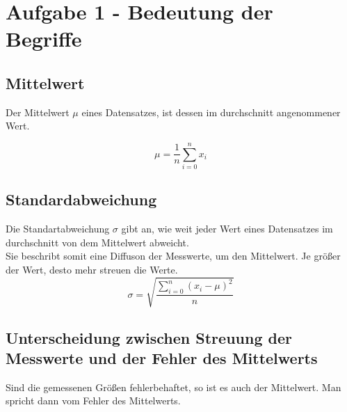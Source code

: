 \section{Aufgabe 1 - Bedeutung der Begriffe}
\subsection{Mittelwert}
    Der Mittelwert $\mu$ eines Datensatzes, ist dessen im durchschnitt angenommener Wert.

    \begin{equation*}
        \mu=\frac{1}{n}\sum_{i=0}^n x_i
    \end{equation*}
\subsection{Standardabweichung}
    Die Standartabweichung $\sigma$ gibt an, wie weit jeder Wert eines Datensatzes im durchschnitt von 
    dem Mittelwert abweicht.\\
    Sie beschribt somit eine Diffuson der Messwerte, um den Mittelwert. Je größer der Wert, desto
    mehr streuen die Werte.
    \begin{equation*}
        \sigma = \sqrt{\frac{\sum_{i=0}^n(x_i-\mu)^2}{n}}
    \end{equation*}
\subsection{Unterscheidung zwischen Streuung der Messwerte und der Fehler des Mittelwerts}
    Sind die gemessenen Größen fehlerbehaftet, so ist es auch der Mittelwert. Man spricht dann vom 
    Fehler des Mittelwerts.\\
